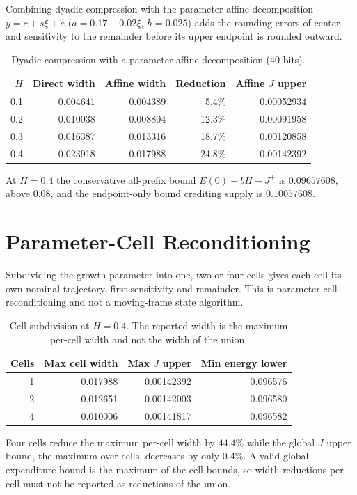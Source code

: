 \documentclass[11pt,notitlepage]{report}
\theoremstyle{definition}
\theoremstyle{remark}
\begin{document}
Combining dyadic compression with the parameter-affine decomposition $y=c+s\xi+e$ ($a=0.17+0.02\xi$, $h=0.025$) adds the rounding errors of center and sensitivity to the remainder before its upper endpoint is rounded outward.
\begin{table}[ht]\centering\small
\caption{Dyadic compression with a parameter-affine decomposition (40 bits).}
\begin{tabular}{rrrrr}\toprule
$H$&Direct width&Affine width&Reduction&Affine $J$ upper\\\midrule
0.1&0.004641&0.004389&5.4\%&0.00052934\\
0.2&0.010038&0.008804&12.3\%&0.00091958\\
0.3&0.016387&0.013316&18.7\%&0.00120858\\
0.4&0.023918&0.017988&24.8\%&0.00142392\\\bottomrule
\end{tabular}
\end{table}
At $H=0.4$ the conservative all-prefix bound $E(0)-bH-J^+$ is $0.09657608$, above $0.08$, and the endpoint-only bound crediting supply is $0.10057608$.

\section{Parameter-Cell Reconditioning}
Subdividing the growth parameter into one, two or four cells gives each cell its own nominal trajectory, first sensitivity and remainder. This is parameter-cell reconditioning and not a moving-frame state algorithm.
\begin{table}[ht]\centering\small
\caption{Cell subdivision at $H=0.4$. The reported width is the maximum per-cell width and not the width of the union.}
\begin{tabular}{rrrr}\toprule
Cells&Max cell width&Max $J$ upper&Min energy lower\\\midrule
1&0.017988&0.00142392&0.096576\\
2&0.012651&0.00142003&0.096580\\
4&0.010006&0.00141817&0.096582\\\bottomrule
\end{tabular}
\end{table}
Four cells reduce the maximum per-cell width by $44.4\%$ while the global $J$ upper bound, the maximum over cells, decreases by only $0.4\%$. A valid global expenditure bound is the maximum of the cell bounds, so width reductions per cell must not be reported as reductions of the union.
\end{document}

